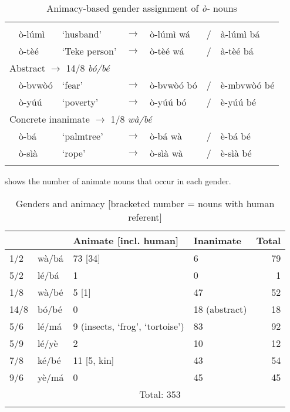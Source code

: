 \documentclass[output=paper,,modfonts,nonflat]{langsci/langscibook}
\begin{document}
\vfill
\begin{table}
\caption{Animacy-based gender assignment of \textit{ò-} nouns}
\label{table14}
\begin{small}
\begin{tabular}{l		l		l		l		l		l		l}
\lsptoprule	
	\multicolumn{7}{l}{Animate $\rightarrow$ 1/2 \textit{wà/bá}}											\\
	& ò-lúmì	&	‘husband’	&	$\rightarrow$	&	ò-lúmì wá	&	/	&	à-lúmì bá	\\
	& ò-tèé	&	‘Teke person’	&	$\rightarrow$	&	ò-tèé wá	&	/	&	à-tèé bá	\\ [0.2cm]
	\multicolumn{7}{l}{Abstract $\rightarrow$ 14/8 \textit{bó/bé}}											\\
	& ò-bvwòó	&	‘fear’	&	$\rightarrow$	&	ò-bvwòó bó	&	/	&	è-mbvwòó bé	\\
	& ò-yúú	&	‘poverty’	&	$\rightarrow$	&	ò-yúú bó	&	/	&	è-yúú bé	\\ [0.2cm]
	\multicolumn{7}{l}{Concrete inanimate $\rightarrow$ 1/8 \textit{wà/bé}}											\\
	& ò-bá	&	‘palmtree’	&	$\rightarrow$	&	ò-bá wà	&	/	&	è-bá bé	\\
	& ò-sìà	&	‘rope’	&	$\rightarrow$	&	ò-sìà wà	&	/	&	è-sìà bé	\\
  \lspbottomrule
\end{tabular}
\end{small}
\end{table}
\vfill
\pagebreak

 shows the number of animate nouns that occur in each gender.

\begin{table}
\caption{Genders and animacy [bracketed number = nouns with human referent]}
\label{table15}
\begin{small}
\begin{tabular}{llllr}
\lsptoprule	
	&		&	Animate [incl. human] 	&	Inanimate	&	Total	\\
\midrule									
1/2	&	wà/bá	&	\cellcolor{gray!60}73 [34]	&	6	&	79	\\
5/2	&	lé/bá	&	\cellcolor{gray!60}1	&	0	&	1	\\
1/8	&	wà/bé	&	5 [1]	&	\cellcolor{gray!60}47	&	52	\\
14/8	&	bó/bé	&	0	&	\cellcolor{gray!60}18 (abstract)	&	18	\\
5/6	&	lé/má	&	9 (insects, ‘frog’, ‘tortoise’)	&	\cellcolor{gray!60}83	&	92	\\
5/9	&	lé/yè	&	2	&	\cellcolor{gray!60}10	&	12	\\
7/8	&	ké/bé	&	11 [5, kin]	&	\cellcolor{gray!60}43	&	54	\\
9/6	&	yè/má	&	0	&	\cellcolor{gray!60}45	&	45	\\\cmidrule{3-4}
	&			&		 \multicolumn{2}{c}{Total: 353} &	\\
\lspbottomrule
\end{tabular}
\end{small}
\end{table}
\end{document}
